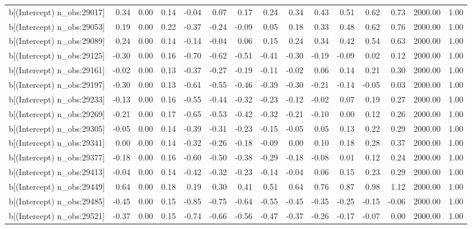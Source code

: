 \begin{table}[ht]
\begin{tabular}{rrrrrrrrrrrrrrr}
  b[(Intercept) n\_obs:29017] & 0.34 & 0.00 & 0.14 & -0.04 & 0.07 & 0.17 & 0.24 & 0.34 & 0.43 & 0.51 & 0.62 & 0.73 & 2000.00 & 1.00 \\ 
  b[(Intercept) n\_obs:29053] & 0.19 & 0.00 & 0.22 & -0.37 & -0.24 & -0.09 & 0.05 & 0.18 & 0.33 & 0.48 & 0.62 & 0.76 & 2000.00 & 1.00 \\ 
  b[(Intercept) n\_obs:29089] & 0.24 & 0.00 & 0.14 & -0.14 & -0.04 & 0.06 & 0.15 & 0.24 & 0.34 & 0.42 & 0.54 & 0.63 & 2000.00 & 1.00 \\ 
  b[(Intercept) n\_obs:29125] & -0.30 & 0.00 & 0.16 & -0.70 & -0.62 & -0.51 & -0.41 & -0.30 & -0.19 & -0.09 & 0.02 & 0.12 & 2000.00 & 1.00 \\ 
  b[(Intercept) n\_obs:29161] & -0.02 & 0.00 & 0.13 & -0.37 & -0.27 & -0.19 & -0.11 & -0.02 & 0.06 & 0.14 & 0.21 & 0.30 & 2000.00 & 1.00 \\ 
  b[(Intercept) n\_obs:29197] & -0.30 & 0.00 & 0.13 & -0.61 & -0.55 & -0.46 & -0.39 & -0.30 & -0.21 & -0.14 & -0.05 & 0.03 & 2000.00 & 1.00 \\ 
  b[(Intercept) n\_obs:29233] & -0.13 & 0.00 & 0.16 & -0.55 & -0.44 & -0.32 & -0.23 & -0.12 & -0.02 & 0.07 & 0.19 & 0.27 & 2000.00 & 1.00 \\ 
  b[(Intercept) n\_obs:29269] & -0.21 & 0.00 & 0.17 & -0.65 & -0.53 & -0.42 & -0.32 & -0.21 & -0.10 & 0.00 & 0.12 & 0.26 & 2000.00 & 1.00 \\ 
  b[(Intercept) n\_obs:29305] & -0.05 & 0.00 & 0.14 & -0.39 & -0.31 & -0.23 & -0.15 & -0.05 & 0.05 & 0.13 & 0.22 & 0.29 & 2000.00 & 1.00 \\ 
  b[(Intercept) n\_obs:29341] & 0.00 & 0.00 & 0.14 & -0.32 & -0.26 & -0.18 & -0.09 & 0.00 & 0.10 & 0.18 & 0.28 & 0.37 & 2000.00 & 1.00 \\ 
  b[(Intercept) n\_obs:29377] & -0.18 & 0.00 & 0.16 & -0.60 & -0.50 & -0.38 & -0.29 & -0.18 & -0.08 & 0.01 & 0.12 & 0.24 & 2000.00 & 1.00 \\ 
  b[(Intercept) n\_obs:29413] & -0.04 & 0.00 & 0.14 & -0.42 & -0.32 & -0.23 & -0.14 & -0.04 & 0.06 & 0.15 & 0.23 & 0.29 & 2000.00 & 1.00 \\ 
  b[(Intercept) n\_obs:29449] & 0.64 & 0.00 & 0.18 & 0.19 & 0.30 & 0.41 & 0.51 & 0.64 & 0.76 & 0.87 & 0.98 & 1.12 & 2000.00 & 1.00 \\ 
  b[(Intercept) n\_obs:29485] & -0.45 & 0.00 & 0.15 & -0.85 & -0.75 & -0.64 & -0.55 & -0.45 & -0.35 & -0.25 & -0.15 & -0.06 & 2000.00 & 1.00 \\ 
  b[(Intercept) n\_obs:29521] & -0.37 & 0.00 & 0.15 & -0.74 & -0.66 & -0.56 & -0.47 & -0.37 & -0.26 & -0.17 & -0.07 & 0.00 & 2000.00 & 1.00 \\ 

\end{tabular}
\end{table}
